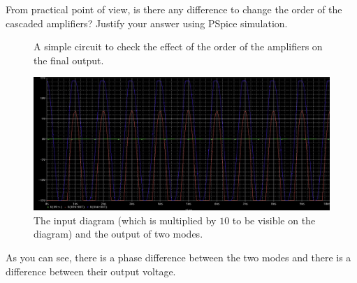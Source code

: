 \documentclass[11pt]{article}
\begin{document}
\begin{question}
\begin{subquestion}{From practical point of view, is there any difference to change the order of the cascaded amplifiers? Justify your answer using PSpice simulation.}
{\begin{figure}[H]
                \caption{A simple circuit to check the effect of the order of the amplifiers on the final output.}
            \end{figure}
            \begin{figure}[H]
                \centering
                \includegraphics[scale=0.25,angle=0]{Fig/Q6b.png}
                \caption{The input diagram (which is multiplied by $10$ to be visible on the diagram) and the output of two modes.}
            \end{figure}
            As you can see, there is a phase difference between the two modes and there is a difference between their output voltage.
        }
    \end{subquestion}

\end{question}
\end{document}
